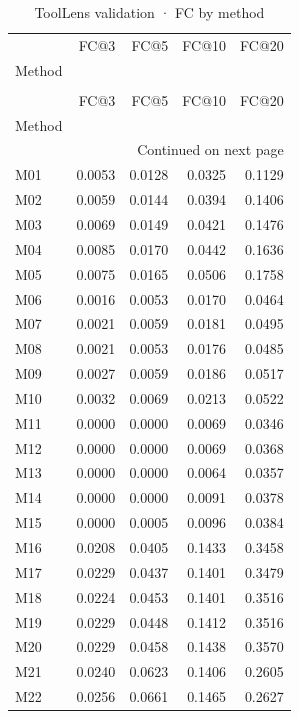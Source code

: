 \begin{longtable}{lrrrr}
\caption{ToolLens validation · FC by method} \label{tab:ToolLens-validation-validation-family-fullcoverage} \\
\toprule
 & FC@3 & FC@5 & FC@10 & FC@20 \\
Method &  &  &  &  \\
\midrule
\endfirsthead
\caption[]{ToolLens validation · FC by method} \\
\toprule
 & FC@3 & FC@5 & FC@10 & FC@20 \\
Method &  &  &  &  \\
\midrule
\endhead
\midrule
\multicolumn{5}{r}{Continued on next page} \\
\midrule
\endfoot
\bottomrule
\endlastfoot
M01 & 0.0053 & 0.0128 & 0.0325 & 0.1129 \\
M02 & 0.0059 & 0.0144 & 0.0394 & 0.1406 \\
M03 & 0.0069 & 0.0149 & 0.0421 & 0.1476 \\
M04 & 0.0085 & 0.0170 & 0.0442 & 0.1636 \\
M05 & 0.0075 & 0.0165 & 0.0506 & 0.1758 \\
M06 & 0.0016 & 0.0053 & 0.0170 & 0.0464 \\
M07 & 0.0021 & 0.0059 & 0.0181 & 0.0495 \\
M08 & 0.0021 & 0.0053 & 0.0176 & 0.0485 \\
M09 & 0.0027 & 0.0059 & 0.0186 & 0.0517 \\
M10 & 0.0032 & 0.0069 & 0.0213 & 0.0522 \\
M11 & 0.0000 & 0.0000 & 0.0069 & 0.0346 \\
M12 & 0.0000 & 0.0000 & 0.0069 & 0.0368 \\
M13 & 0.0000 & 0.0000 & 0.0064 & 0.0357 \\
M14 & 0.0000 & 0.0000 & 0.0091 & 0.0378 \\
M15 & 0.0000 & 0.0005 & 0.0096 & 0.0384 \\
M16 & 0.0208 & 0.0405 & 0.1433 & 0.3458 \\
M17 & 0.0229 & 0.0437 & 0.1401 & 0.3479 \\
M18 & 0.0224 & 0.0453 & 0.1401 & 0.3516 \\
M19 & 0.0229 & 0.0448 & 0.1412 & 0.3516 \\
M20 & 0.0229 & 0.0458 & 0.1438 & 0.3570 \\
M21 & 0.0240 & 0.0623 & 0.1406 & 0.2605 \\
M22 & 0.0256 & 0.0661 & 0.1465 & 0.2627 \\

\end{longtable}
